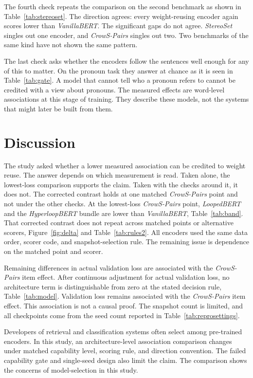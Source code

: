 \documentclass[sigconf,natbib=true,anonymous=true]{acmart}
\begin{document}
\label{sec:stereoset}
The fourth check repeats the comparison on the second benchmark as shown in
Table~\ref{tab:stereoset}. The direction agrees: every weight-reusing encoder
again scores lower than \emph{VanillaBERT}. The significant gaps do not agree.
\emph{StereoSet} singles out one encoder, and \emph{CrowS-Pairs} singles out
two. Two benchmarks of the same kind have not shown the same pattern.

\label{sec:capability}
The last check asks whether the encoders follow the sentences well enough for
any of this to matter. On the pronoun task they answer at chance as it is seen in 
Table~\ref{tab:gate}. A model that cannot tell who a pronoun refers to cannot be
credited with a view about pronouns. The measured effects are word-level
associations at this stage of training. They describe these models, not the
systems that might later be built from them.

\section{Discussion}
\label{sec:discussion}

The study asked whether a lower measured association can be credited to weight
reuse. The answer depends on which measurement is read. Taken alone, the
lowest-loss comparison supports the claim. Taken with the checks around it, it
does not. The
corrected contrast holds at one matched \emph{CrowS-Pairs} point and not under
the other checks. At the lowest-loss \emph{CrowS-Pairs} point,
\emph{LoopedBERT} and the \emph{HyperloopBERT} bundle are lower than
\emph{VanillaBERT}, Table~\ref{tab:band}. That corrected contrast does not
repeat across matched points or alternative scorers, Figure~\ref{fig:delta} and
Table~\ref{tab:rules2}. All encoders used the same data order, scorer code, and
snapshot-selection rule. The remaining issue is dependence on the matched point
and scorer.

Remaining differences in actual validation loss are associated with the
\emph{CrowS-Pairs} item effect. After continuous adjustment for actual
validation loss, no architecture term is distinguishable from zero at the stated
decision rule, Table~\ref{tab:model}. Validation loss remains associated with the \emph{CrowS-Pairs} item effect. This association is
not a causal proof. The snapshot count is limited, and all checkpoints come from
the seed count reported in Table~\ref{tab:reprosettings}.


Developers of retrieval and classification systems often select among
pre-trained encoders. In this study, an architecture-level association
comparison changes under matched capability level, scoring rule, and direction
convention. The failed capability gate and single-seed design also limit the
claim. The comparison shows the concerns of model-selection in this study.
\end{document}
